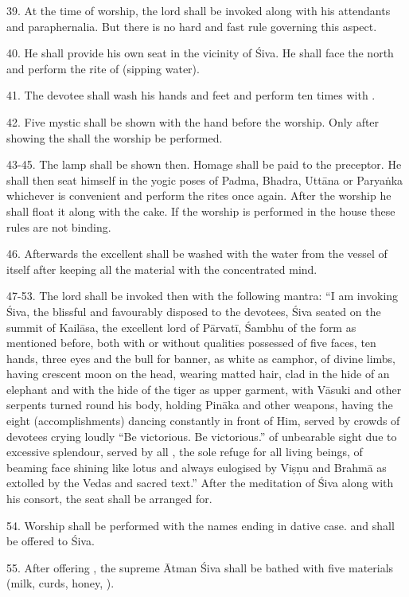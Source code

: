 39. At the time of worship, the lord shall be invoked along with his attendants
and paraphernalia. But there is no hard and fast rule governing this aspect.

40. He shall provide his own seat in the vicinity of Śiva. He shall face
the north and perform the rite of  (sipping water).

41. The devotee shall wash his hands and feet and perform  ten
times with .

42. Five mystic  shall be shown with the hand before the worship.
Only after showing the  shall the worship be performed.

43-45. The lamp shall be shown then. Homage shall be paid to the preceptor. He
shall then seat himself in the yogic poses of Padma, Bhadra, Uttāna or Paryaṅka
whichever is convenient and perform the rites once again. After the worship he
shall float it along with the cake. If the worship is performed in the house
these rules are not binding.

46. Afterwards the excellent  shall be washed with the water from
the vessel of  itself after keeping all the material with the
concentrated mind.

47-53. The lord shall be invoked then with the following mantra: “I am invoking
Śiva, the blissful and favourably disposed to the devotees, Śiva seated on
the summit of Kailāsa, the excellent lord of Pārvatī, Śambhu of the form as
mentioned before, both with or without qualities possessed of five faces, ten
hands, three eyes and the bull for banner, as white as camphor, of divine limbs,
having crescent moon on the head, wearing matted hair, clad in the hide of an
elephant and with the hide of the tiger as upper garment, with Vāsuki and other
serpents turned round his body, holding Pināka and other weapons, having the
eight  (accomplishments) dancing constantly in front of Him, served
by crowds of devotees crying loudly “Be victorious. Be victorious.” of unbearable
sight due to excessive splendour, served by all , the sole refuge for
all living beings, of beaming face shining like lotus and always eulogised by
Viṣṇu and Brahmā as extolled by the Vedas and sacred text.” After the meditation
of Śiva along with his consort, the seat shall be arranged for.

54. Worship shall be performed with the names ending in dative case. 
and  shall be offered to Śiva.

55. After offering , the supreme Ātman Śiva shall be bathed with
five materials (milk, curds, honey, \etc).

